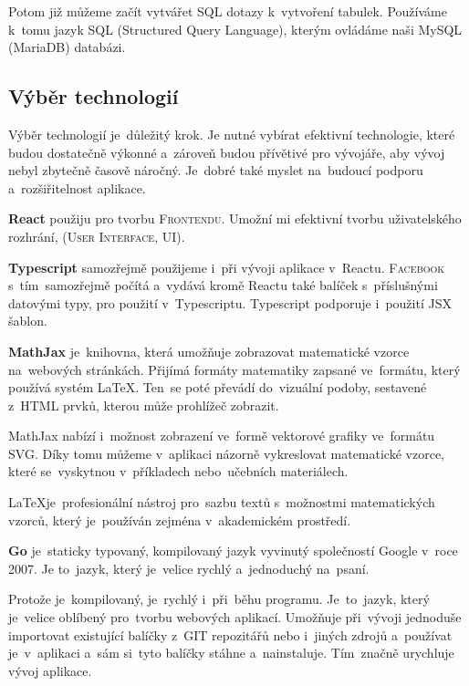 \documentclass[14pt,a4paper]{article}
\begin{document}
        Potom již můžeme začít vytvářet SQL dotazy k~vytvoření tabulek. Používáme k~tomu jazyk \textsc{SQL} (Structured Query Language), kterým ovládáme naši MySQL (MariaDB) databázi.

        \subsection{Výběr technologií}
            Výběr technologií je~důležitý krok. Je nutné vybírat efektivní technologie, které budou dostatečně výkonné a~zároveň budou
            přívětivé pro vývojáře, aby vývoj nebyl zbytečně časově náročný. Je~dobré také myslet na~budoucí podporu a~rozšiřitelnost aplikace.

            \textbf{React} použiju pro tvorbu \textsc{Frontendu}. Umožní mi efektivní tvorbu uživatelského rozhrání, (\textsc{User Interface, UI}).

            \textbf{Typescript} samozřejmě použijeme i~při vývoji aplikace v~Reactu. \textsc{Facebook} s~tím~samozřejmě počítá a~vydává
            kromě Reactu také balíček s~příslušnými datovými typy, pro použití v~Typescriptu. Typescript podporuje i~použití JSX šablon. \parencite[Refeerence/Handbook/JSX]{TypeScript}

            \textbf{MathJax} je~knihovna, která umožňuje zobrazovat matematické vzorce na~webových stránkách.
            Přijímá formáty matematiky zapsané ve~formátu, který používá systém \LaTeX. Ten~se poté převádí do~vizuální podoby, sestavené z~HTML prvků, kterou může prohlížeč zobrazit.
            
            MathJax nabízí i~možnost zobrazení ve~formě vektorové grafiky ve~formátu SVG.
            Díky tomu můžeme v~aplikaci názorně vykreslovat matematické vzorce, které se~vyskytnou v~příkladech nebo~učebních materiálech.\parencite{abclinuxuMatematickxE9Vzorce}

            \LaTeX je~profesionální nástroj pro~sazbu textů s~možnostmi matematických vzorců, který je~používán zejména v~akademickém prostředí.\parencite{Rybicka2003:latex}

            \textbf{Go} je~staticky typovaný, kompilovaný jazyk vyvinutý společností Google v~roce 2007. Je to~jazyk, který je~velice rychlý a~jednoduchý na~psaní.

            Protože je~kompilovaný, je~rychlý i~při~běhu programu. Je~to~jazyk, který je~velice oblíbený pro~tvorbu webových aplikací. Umožňuje při~vývoji jednoduše importovat existující balíčky z~GIT repozitářů nebo i~jiných zdrojů a~používat je~v~aplikaci a~sám si~tyto balíčky stáhne a~nainstaluje. Tím~značně urychluje vývoj aplikace.
\end{document}
